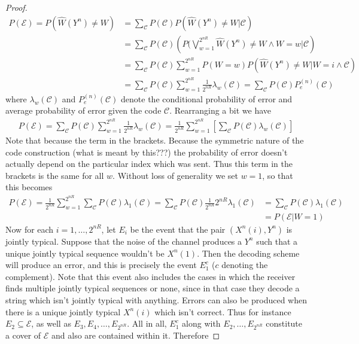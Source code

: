 \begin{proof}
\begin{align}
	P(\mathcal{E}) = P(\hat{W}(Y^n) \neq W) &= \sum_{\mathcal{C}}P(\mathcal{C})P(\hat{W}(Y^n)\neq W|\mathcal{C}) \\
		&= \sum_{\mathcal{C}}P(\mathcal{C})\left(P(\bigvee_{w=1}^{2^{nR}} \hat{W}(Y^n)\neq W \wedge W=w |\mathcal{C} \right) \\
		&= \sum_{\mathcal{C}}P(\mathcal{C})\sum_{w=1}^{2^{nR}}P(W=w)P(\hat{W}(Y^n)\neq W|W=i \wedge \mathcal{C}) \\
		&= \sum_{\mathcal{C}}P(\mathcal{C})\sum_{w=1}^{2^{nR}}\frac{1}{2^{nR}}\lambda_w(\mathcal{C}) = \sum_{\mathcal{C}}P(\mathcal{C})P_e^{(n)}(\mathcal{C})
\end{align}
where $\lambda_w(\mathcal{C})$ and $P_e^{(n)}(\mathcal{C})$ denote the conditional probability of error and average probability of error given the code $\mathcal{C}$. Rearranging a bit we have
\begin{align}
	P(\mathcal{E}) = \sum_{\mathcal{C}}P(\mathcal{C})\sum_{w=1}^{2^{nR}}\frac{1}{2^{nR}}\lambda_w(\mathcal{C}) = \frac{1}{2^{nR}}\sum_{w=1}^{2^{nR}}\left[ \sum_{\mathcal{C}}P(\mathcal{C})\lambda_w(\mathcal{C}) \right]
\end{align}
Note that because the term in the brackets. Because the symmetric nature of the code construction (what is meant by this???) the probability of error doesn't actually depend on the particular index which was sent. Thus this term in the brackets is the same for all $w$. Without loss of generality we set $w=1$, so that this becomes 
\begin{align}
	P(\mathcal{E}) = \frac{1}{2^{nR}}\sum_{w=1}^{2^{nR}}\sum_{\mathcal{C}}P(\mathcal{C})\lambda_1(\mathcal{C}) = \sum_{\mathcal{C}}P(\mathcal{C})\frac{1}{2^{nR}}2^{nR}\lambda_1(\mathcal{C}) &= \sum_{\mathcal{C}}P(\mathcal{C})\lambda_1(\mathcal{C}) \\
	&= P(\mathcal{E}|W=1)
\end{align}
Now for each $i=1,\ldots,2^{nR}$, let $E_i$ be the event that the pair $(X^n(i),Y^n)$ is jointly typical. Suppose that the noise of the channel produces a $Y^n$ such that a unique jointly typical sequence wouldn't be $X^n(1)$. Then the decoding scheme will produce an error, and this is precisely the event $E_1^c$ ($c$ denoting the complement). Note that this event also includes the cases in which the receiver finds multiple jointly typical sequences or none, since in that case they decode a string which isn't jointly typical with anything. Errors can also be produced when there is a unique jointly typical $X^n(i)$ which isn't correct. Thus for instance $E_2 \subseteq \mathcal{E}$, as well as $E_3,E_4,\ldots,E_{2^{nR}}$. All in all, $E_1^c$ along with $E_2,\ldots,E_{2^{nR}}$ constitute a cover of $\mathcal{E}$ and also are contained within it. Therefore

\end{proof}
